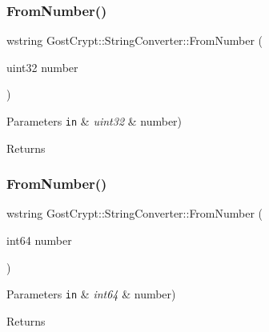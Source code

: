 \subsubsection{\texorpdfstring{From\+Number()}{FromNumber()}\hspace{0.1cm}{\footnotesize\ttfamily [3/5]}}
{\footnotesize\ttfamily wstring Gost\+Crypt\+::\+String\+Converter\+::\+From\+Number (\begin{DoxyParamCaption}\item[{uint32}]{number }\end{DoxyParamCaption})\hspace{0.3cm}{\ttfamily [static]}}


\begin{DoxyParams}[1]{Parameters}
\mbox{\tt in}  & {\em uint32} & number) \\
\hline
\end{DoxyParams}
\begin{DoxyReturn}{Returns}

\end{DoxyReturn}
\mbox{\label{class_gost_crypt_1_1_string_converter_aa3baa25ce83f48273ae27b3943ceb4b1}} 
\subsubsection{\texorpdfstring{From\+Number()}{FromNumber()}\hspace{0.1cm}{\footnotesize\ttfamily [4/5]}}
{\footnotesize\ttfamily wstring Gost\+Crypt\+::\+String\+Converter\+::\+From\+Number (\begin{DoxyParamCaption}\item[{int64}]{number }\end{DoxyParamCaption})\hspace{0.3cm}{\ttfamily [static]}}


\begin{DoxyParams}[1]{Parameters}
\mbox{\tt in}  & {\em int64} & number) \\
\hline
\end{DoxyParams}
\begin{DoxyReturn}{Returns}

\end{DoxyReturn}
\mbox{\label{class_gost_crypt_1_1_string_converter_ab2f8b1c6a29c7c6a235cfc8828e1b7db}} 

